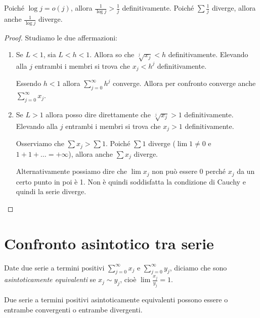 Poiché $\log j = o(j)$, allora $\frac{1}{\log j} > \frac{1}{j}$ definitivamente. Poiché $\sum \frac{1}{j}$ diverge, allora anche $\frac{1}{\log j}$ diverge.

\begin{proof}
Studiamo le due affermazioni:
\begin{enumerate}
\item 
Se $L < 1$, sia $L < h < 1$. Allora so che $\sqrt[j]{x_j} < h$ definitivamente. Elevando alla $j$ entrambi i membri si trova che $x_j < h^j$ definitivamente.

Essendo $h < 1$ allora $\sum_{j=0}^\infty h^j$ converge. Allora per confronto converge anche $\sum_{j=0}^\infty x_j$.

\item Se $L > 1$ allora posso dire direttamente che  $\sqrt[j]{x_j} > 1$ definitivamente. Elevando alla $j$ entrambi i membri si trova che $x_j > 1$ definitivamente.

Osserviamo che $\sum x_j > \sum 1$. Poiché $\sum 1$ diverge ($\lim 1 \neq 0$ e $1 + 1 + \ldots = +\infty$), allora anche $\sum x_j$ diverge.

Alternativamente possiamo dire che $\lim x_j$ non può essere 0 perché $x_j$ da un certo punto in poi è 1. Non è quindi soddisfatta la condizione di Cauchy e quindi la serie diverge.
\end{enumerate}
\end{proof}

\section{Confronto asintotico tra serie}
\begin{definition}
Date due serie a termini positivi $\sum_{j=0}^\infty x_j$ e $\sum_{j=0}^\infty y_j$, diciamo che sono \emph{asintoticamente equivalenti} se $x_j \sim y_j$, cioè $\lim \frac{x_j}{y_j} = 1$.
\end{definition}

\begin{theorem}
Due serie a termini positivi asintoticamente equivalenti possono essere o entrambe convergenti o entrambe divergenti.
\end{theorem}

